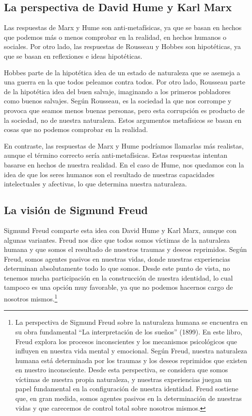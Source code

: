 \documentclass[
  a4paper,
]{article}
\begin{document}
\subsection{La perspectiva de David Hume y Karl
Marx}\label{la-perspectiva-de-david-hume-y-karl-marx}

Las respuestas de Marx y Hume son anti-metafísicas, ya que se basan en
hechos que podemos más o menos comprobar en la realidad, en hechos
humanos o sociales. Por otro lado, las respuestas de Rousseau y Hobbes
son hipotéticas, ya que se basan en reflexiones e ideas hipotéticas.

Hobbes parte de la hipotética idea de un estado de naturaleza que se
asemeja a una guerra en la que todos peleamos contra todos. Por otro
lado, Rousseau parte de la hipotética idea del buen salvaje, imaginando
a los primeros pobladores como buenos salvajes. Según Rousseau, es la
sociedad la que nos corrompe y provoca que seamos menos buenas personas,
pero esta corrupción es producto de la sociedad, no de nuestra
naturaleza. Estos argumentos metafísicos se basan en cosas que no
podemos comprobar en la realidad.

En contraste, las respuestas de Marx y Hume podríamos llamarlas más
realistas, aunque el término correcto sería anti-metafísicas. Estas
respuestas intentan basarse en hechos de nuestra realidad. En el caso de
Hume, nos quedamos con la idea de que los seres humanos son el resultado
de nuestras capacidades intelectuales y afectivas, lo que determina
nuestra naturaleza.

\subsection{La visión de Sigmund
Freud}\label{la-visiuxf3n-de-sigmund-freud}

Sigmund Freud comparte esta idea con David Hume y Karl Marx, aunque con
algunas variantes. Freud nos dice que todos somos víctimas de la
naturaleza humana y que somos el resultado de nuestros traumas y deseos
reprimidos. Según Freud, somos agentes pasivos en nuestras vidas, donde
nuestras experiencias determinan absolutamente todo lo que somos. Desde
este punto de vista, no tenemos mucha participación en la construcción
de nuestra identidad, lo cual tampoco es una opción muy favorable, ya
que no podemos hacernos cargo de nosotros mismos.\footnote{La
  perspectiva de Sigmund Freud sobre la naturaleza humana se encuentra
  en su obra fundamental ``La interpretación de los sueños'' (1899). En
  este libro, Freud explora los procesos inconscientes y los mecanismos
  psicológicos que influyen en nuestra vida mental y emocional. Según
  Freud, nuestra naturaleza humana está determinada por los traumas y
  los deseos reprimidos que existen en nuestro inconsciente. Desde esta
  perspectiva, se considera que somos víctimas de nuestra propia
  naturaleza, y nuestras experiencias juegan un papel fundamental en la
  configuración de nuestra identidad. Freud sostiene que, en gran
  medida, somos agentes pasivos en la determinación de nuestras vidas y
  que carecemos de control total sobre nosotros mismos.}
\end{document}
